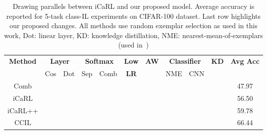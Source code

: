 \documentclass[final]{cvpr}
\def\yo{\ensuremath\checkmark}
\def\byo{\pmb{\ensuremath\checkmark}}
\begin{document}
 







\begin{table*}[!t]
\begin{center}
 \begin{tabular}{|c || c | c || c | c || c || c || c | c  || c || c |} 
 \hline
\multirow{2}{*}{\textbf{Method}} & \multicolumn{2}{c||}{\textbf{Layer}} &  \multicolumn{2}{c||}{\textbf{Softmax}} & {\textbf{Low}} & \multirow{2}{*}{\textbf{AW}} &  \multicolumn{2}{c||}{\textbf{Classifier}}  & \multirow{2}{*}{\textbf{KD}} & \multirow{2}{*}{\textbf{Avg Acc}}\\
 & Cos & Dot & Sep &  Comb  & {\textbf{LR}} &   & NME &  CNN  &  & \\ [0.5ex] 
 \hline\hline
Comb         &        & \yo   &        &  \yo  &         &        &   &  \yo    &      &   47.97   \\
 \hline
iCaRL       &        & \yo   &        &  \yo  &         &        &  \yo  &    &  \yo  &   56.50   \\
\hline
iCaRL++  &  \yo   &       &        &  \yo  &         &  \yo        &  & \yo  &  \yo  &   59.78       \\
\hline
CCIL  &  \yo   &       & \cellcolor{blue!15}\byo    &       &  \cellcolor{blue!15}\byo    &  \yo   &  &  \yo  &  \yo  &   66.44    \\
\hline
\end{tabular}
\end{center}
\caption{Drawing parallels between iCaRL and our proposed model. Average accuracy is reported for 5-task class-IL experiments on CIFAR-100 dataset. Last row highlights our proposed changes. All methods use random exemplar selection as used in this work, Dot: linear layer, KD: knowledge distillation, NME: nearest-mean-of-exemplars (used in~\cite{icarl})}
\label{tab:icarl_vs_ccil}
\end{table*}
\end{document}
